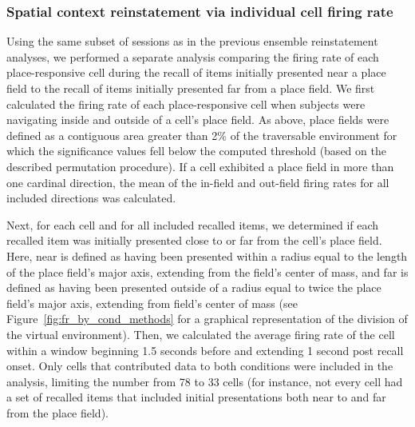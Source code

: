 \subsubsection*{Spatial context reinstatement via individual cell firing rate}
Using the same subset of sessions as in the previous ensemble reinstatement analyses, we performed a separate analysis comparing the firing rate of each place-responsive cell during the recall of items initially presented near a place field to the recall of items initially presented far from a place field.  We first calculated the firing rate of each place-responsive cell when subjects were navigating inside and outside of a cell's place field. As above, place fields were defined as a contiguous area greater than 2\% of the traversable environment for which the significance values fell below the computed threshold (based on the described permutation procedure).  If a cell exhibited a place field in more than one cardinal direction, the mean of the in-field and out-field firing rates for all included directions was calculated.

Next, for each cell and for all included recalled items, we determined if each recalled item was initially presented close to or far from the cell's place field. Here, near is defined as having been presented within a radius equal to the length of the place field's major axis, extending from the field's center of mass, and far is defined as having been presented outside of a radius equal to twice the place field's major axis, extending from field's center of mass (see Figure~\ref{fig:fr_by_cond_methods} for a graphical representation of the division of the virtual environment). Then, we calculated the average firing rate of the cell within a window beginning 1.5 seconds before and extending 1 second post recall onset. Only cells that contributed data to both conditions were included in the analysis, limiting the number from 78 to 33 cells (for instance, not every cell had a set of recalled items that included initial presentations both near to and far from the place field).

